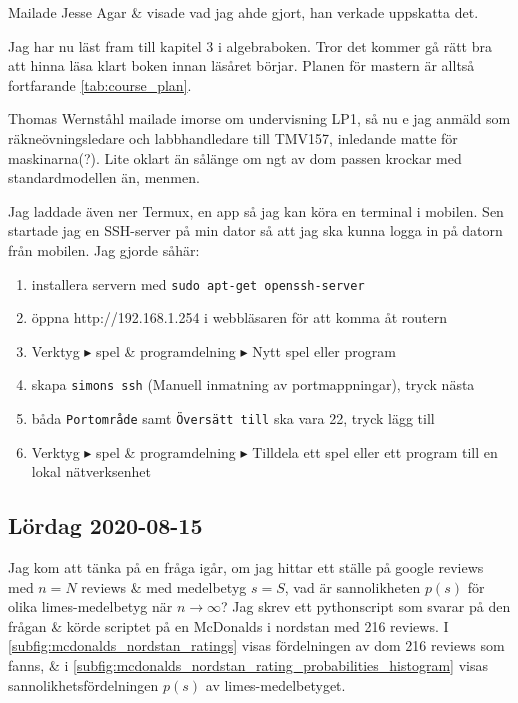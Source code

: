 Mailade Jesse Agar \& visade vad jag ahde gjort, han verkade uppskatta det.

\bigskip

Jag har nu läst fram till kapitel 3 i algebraboken. Tror det kommer gå rätt bra att hinna läsa klart boken innan läsåret börjar. Planen för mastern är alltså fortfarande \cref{tab:course_plan}.



Thomas Wernståhl mailade imorse om undervisning LP1, så nu e jag anmäld som räkneövningsledare och labbhandledare till TMV157, inledande matte för maskinarna(?). Lite oklart än sålänge om ngt av dom passen krockar med standardmodellen än, menmen.

\bigskip

Jag laddade även ner Termux, en app så jag kan köra en terminal i mobilen. Sen startade jag en SSH-server på min dator så att jag ska kunna logga in på datorn från mobilen. Jag gjorde såhär:
\begin{enumerate}
    \item installera servern med \texttt{sudo apt-get openssh-server}
    \item öppna http://192.168.1.254 i webbläsaren för att komma åt routern
    \item Verktyg $\blacktriangleright$ spel \& programdelning $\blacktriangleright$ Nytt spel eller program
    \item skapa \texttt{simons ssh} (Manuell inmatning av portmappningar), tryck nästa
    \item båda \texttt{Portområde} samt \texttt{Översätt till} ska vara 22, tryck lägg till
    \item Verktyg $\blacktriangleright$ spel \& programdelning $\blacktriangleright$ Tilldela ett spel eller ett program till en lokal nätverksenhet
\end{enumerate}


\subsection*{Lördag 2020-08-15}

Jag kom att tänka på en fråga igår, om jag hittar ett ställe på google reviews med $n = N$ reviews \& med medelbetyg $s = S$, vad är sannolikheten $p(s)$ för olika limes-medelbetyg när $n \to \infty$? Jag skrev ett pythonscript som svarar på den frågan \& körde scriptet på en McDonalds i nordstan med 216 reviews. I \cref{subfig:mcdonalds_nordstan_ratings} visas fördelningen av dom 216 reviews som fanns, \& i \cref{subfig:mcdonalds_nordstan_rating_probabilities_histogram} visas sannolikhetsfördelningen $p(s)$ av limes-medelbetyget.

